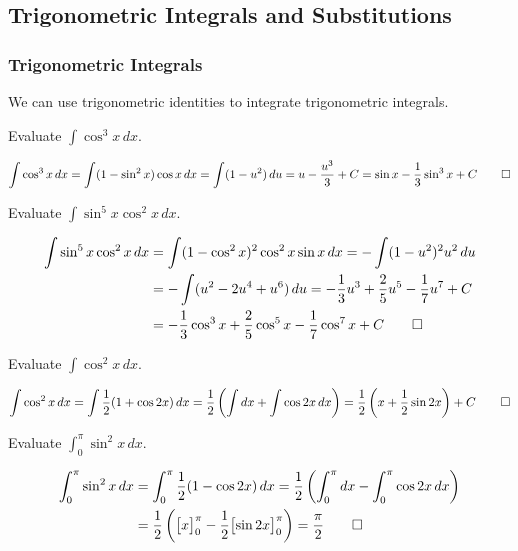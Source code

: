 \subsection{Trigonometric Integrals and Substitutions}
\subsubsection{Trigonometric Integrals}
We can use trigonometric identities to integrate trigonometric integrals.
\begin{problem}
    Evaluate \(\displaystyle{\int\cos^3 x\,dx}\).
\end{problem}
\begin{solution}
    \[\int\cos^3 x\,dx=\int(1-\sin^2 x)\cos x\,dx=\int(1-u^2)\,du
    =u-\frac{u^3}{3}+C=\sin x-\frac{1}{3}\sin^3 x+C\qedhere\]
\end{solution}
\begin{problem}
    Evaluate \(\displaystyle{\int\sin^5 x\cos^2 x\,dx}\).
\end{problem}
\begin{solution}
    \begin{align*}
        \int\sin^5 x\cos^2 x\,dx &= \int(1-\cos^2 x)^2\cos^2 x\sin x\,dx
        =-\int(1-u^2)^2u^2\,du \\
        &= -\int(u^2-2u^4+u^6)\,du
        =-\frac{1}{3}u^3+\frac{2}{5}u^5-\frac{1}{7}u^7+C \\
        &= -\frac{1}{3}\cos^3 x+\frac{2}{5}\cos^5 x-\frac{1}{7}\cos^7 x
        +C \qedhere
    \end{align*}
\end{solution}
\begin{problem}
    Evaluate \(\displaystyle{\int\cos^2 x\,dx}\).
\end{problem}
\begin{solution}
    \[\int\cos^2 x\,dx=\int\frac{1}{2}(1+\cos 2x)\,dx
    =\frac{1}{2}\left(\int dx+\int\cos 2x\,dx\right)
    =\frac{1}{2}\left(x+\frac{1}{2}\sin 2x\right)+C\qedhere\]
\end{solution}
\begin{problem}
    Evaluate \(\displaystyle{\int_0^\pi\sin^2 x\,dx}\).
\end{problem}
\begin{solution}
    \begin{align*}
    \int_0^\pi\sin^2 x\,dx &= \int_0^\pi\frac{1}{2}(1-\cos 2x)\,dx
    =\frac{1}{2}\left(\int_0^\pi dx-\int_0^\pi\cos 2x\,dx\right) \\
    &=\frac{1}{2}
    \left(\bigl[x\bigr]_0^\pi-\frac{1}{2}\bigl[\sin 2x\bigr]_0^\pi\right)
    =\frac{\pi}{2} \qedhere
    \end{align*}
\end{solution}
